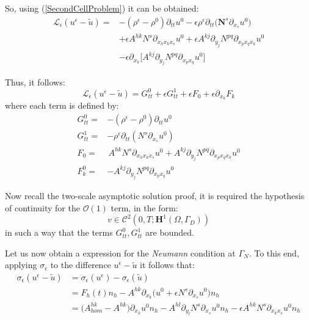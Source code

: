So, using (\ref{SecondCellProblem}) it can be obtained:
\begin{align*}
    \mathcal{L}_{\epsilon} (u^{\epsilon} -\tilde{u})  = & - (\rho^{\epsilon}-\rho^0) \partial_{tt} u^0 - \epsilon \rho^{\epsilon} \partial_{tt}\big(\mathbf{N}^s \partial_{x_s}u^0 \big)  \\
    & + \epsilon A^{hk} N^s \partial_{x_h x_k x_s} u^0 + \epsilon A^{kj} \partial_{y_j} N^{pq} \partial_{x_p x_q x_k} u^0  \\
    & - \epsilon \partial_{x_k} \big[ A^{kj} \partial_{y_j} N^{pq} \partial_{x_p x_q} u^0\big] 
\end{align*}

Thus, it follows:
\begin{equation}
    \mathcal{L}_{\epsilon} (u^{\epsilon}-\tilde{u}) = G_{tt}^0 + \epsilon G_{tt}^1 + \epsilon F_0 + \epsilon \partial_{x_k} F_k
\end{equation}
where each term is defined by:
\begin{equation}
    \label{Variables}
    \begin{aligned}
        G_{tt}^0 = & -(\rho^{\epsilon} - \rho^0) \partial_{tt}u^0 \\
        G_{tt}^1 = & -\rho^{\epsilon} \partial_{tt}(N^s \partial_{x_s} u^0) \\
        F_0 = & \, A^{hk}N^s \partial_{x_h x_k x_s} u^0  + A^{kj}\partial_{y_j} N^{pq} \partial_{x_p x_q x_k} u^0 \\
        F^0_k = & - A^{kj} \partial_{y_j} N^{pq} \partial_{x_p x_q} u^0 
    \end{aligned}
\end{equation}

\begin{rem}
Now recall the two-scale asymptotic solution proof, it is required the hypothesis of continuity for the $\mathcal{O}(1)$ term, in the form:
\begin{equation*}
    v \in \mathcal{C}^2(0,T; \mathbf{H}^1(\Omega, \Gamma_D))
\end{equation*}
in such a way that the terms $G^0_{tt}, G_{tt}^1$ are bounded.
\end{rem}

Let us now obtain a expression for the \textit{Neumann} condition at $\Gamma_N$. To this end, applying $\sigma_{\epsilon}$ to the difference $u^{\epsilon} - \tilde{u}$ it follows that:
\begin{align*}
    \sigma_{\epsilon} (u^{\epsilon} - \tilde{u}) & =  \sigma_{\epsilon}(u^{\epsilon}) - \sigma_{\epsilon} (\tilde{u}) \\
    & = F_h(t) n_h - A^{hk} \partial_{x_k} \big( u^0 + \epsilon N^s \partial_{x_s}u^0 \big)n_h \\
    & = \big(A^{hk}_{hom} - A^{hk} \big) \partial_{x_k} u^0 n_h - A^{hl} \partial_{y_l} N^s \partial_{x_s} u^0 n_h - \epsilon A^{hk} N^s \partial_{x_k x_s} u^0 n_h
\end{align*}

